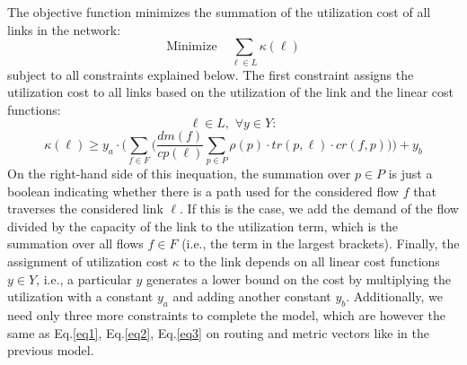 \documentclass[journal]{IEEEtran}
\begin{document}
The objective function minimizes the summation of the utilization cost of all links in the network:
\begin{equation*}
\text{Minimize}\,\,\,\,\,\, \sum_{\ell\in L} \kappa(\ell)
\end{equation*}
subject to all constraints explained below. The first constraint assigns the utilization cost to all links based on the utilization of the link and the linear cost functions:
\[\ell\in L, \,\, \forall y\in Y:\]
\[
\kappa(\ell) \geq y_a \cdot \Bigg( \sum_{f\in F} \bigg( \frac{dm(f)}{cp(\ell)} \sum_{p\in P} \rho(p)\cdot tr(p,\ell) \cdot cr(f,p) \bigg) \Bigg) + y_b
\]
On the right-hand side of this inequation, the summation over $p\in P$ is just a boolean indicating whether there is a path used for the considered flow $f$ that traverses the considered link $\ell$. If this is the case, we add the demand of the flow divided by the capacity of the link to the utilization term, which is the summation over all flows $f\in F$ (i.e., the term in the largest brackets). Finally, the assignment of utilization cost $\kappa$ to the link depends on all linear cost functions $y\in Y$, i.e., a particular $y$ generates a lower bound on the cost by multiplying the utilization with a constant $y_a$ and adding another constant $y_b$. Additionally, we need only three more constraints to complete the model, which are however the same as Eq.\ref{eq1}, Eq.\ref{eq2}, Eq.\ref{eq3} on routing and metric vectors like in the previous model.
\end{document}
